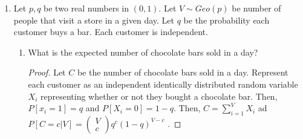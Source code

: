 \documentclass[a4paper]{article}
\begin{document}
\begin{enumerate}
\begin{proof}
      Alternatively, if the contestant picks $x \in \{D,E,F\} $, then Monty Hall has to open $y \in \{X,Y\}$. If the contestant stays, he loses, but if the contestant switches then there is a $\frac{1}{3}$ chance of getting a prize. \\


      Now, let's got back to the setup. Assuming the contestant uniformly chooses one of $\{A,B,C,D,E,F\} $ uniformly then if he doesn't switch, $P[\text{win} | \text{No switch}, x \in \{A,B\} ] = 1$,  $P[\text{win} | \text{switch}, x \in \{A,B\} ] = 0$ and $P[x \in \{A,B\}] = \frac{2}{5}$ while $P[\text{win} | \text{No switch}, x \in \{D,E,F\} ] = 0$ and $P[\text{win} | \text{Switch}, x \in \{D,E,F\}] = \frac{1}{3}$, $P[x \in \{D,E,F\}] $. Then

\begin{align*}
  P[\text{win}|\text{switch}] &= P[\text{win} | \text{switch}, x \in \{A,B\} ] + P[\text{win} | \text{switch}, x \in \{D,E,F\} ] \\ 
                              &= 0 \cdot \frac{2}{5} + \frac{1}{3} \cdot \frac{3}{5} \\
                              &= \frac{1}{5}
.\end{align*}
and,
\begin{align*}
  P[\text{win} | \text{no switch}] &= P[\text{win} | \text{no switch}, x \in \{A,B\} ] + P[\text{win} | \text{no switch}, x \in \{D,E,F\} ] \\ 
                                   &= 1 \cdot \frac{2}{5} + 0 \cdot \frac{3}{5}\\
                                   &= \frac{2}{5}
.\end{align*}
Thus, the contestant should not switch as $P[\text{win} | \text{no switch}] = \frac{2}{5} > P[\text{win} | \text{switch}] = \frac{1}{5}$
    \end{proof}
  \item Let $p,q$ be two real numbers in  $(0,1)$. Let  $V \sim Geo(p)$ be number of people that visit a store in a given day. Let  $q$ be the probability each customer buys a bar. Each customer is independent.
     \begin{enumerate}
       \item What is the expected number of chocolate bars sold in a day?
         \begin{proof}
           Let $C$ be the number of chocolate bars sold in a day.  Represent each customer as an independent identically distributed random variable $X_i$ representing whether or not they bought a chocolate bar. Then,  $P[x_i = 1] = q$  and $P[X_i = 0]=1-q$. Then, $C = \sum_{i=1}^{V} X_i$ ad $P[C= c| V] = \begin{pmatrix} V\\ c \end{pmatrix} q^{c}(1-q)^{V-c}$ .

\end{proof}
\end{enumerate}
\end{enumerate}
\end{document}
